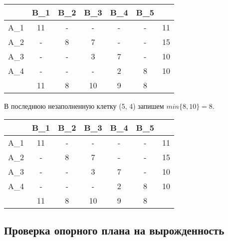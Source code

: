 \documentclass{article}
\begin{document}
\begin{table}[H]
    \centering
    \begin{tabular}{|c|c|c|c|c|c| |c|}
    \hline
        &\cellcolor{myGren} B_1 & \cellcolor{myGren}B_2 & \cellcolor{myGren}B_3 & \cellcolor{myGren}B_4 & \cellcolor{myGren} B_5 &  \\ \hline
       \cellcolor{myGren} A_1 &  11 & - &- & - & - & 11\\ \hline
       \cellcolor{myGren} A_2 & - & 8 & 7 & - & - & 15\\  \hline
       \cellcolor{myGren} A_3 & - & - & 3 & 7 & - & 10\\ \hline
       \cellcolor{myGren} A_4 & - & - & - & 2 & \cellcolor{Gray}8 & \cellcolor{Gray}10\\ \hline \hline
            & 11 &  8 & 10 & 9 & \cellcolor{Gray}8 & \\
        \hline
    \end{tabular}
    \label{tab:my_label}
\end{table}

\noindent В последнюю незаполненную клетку (5, 4) запишем $min\{8, 10\} = 8$.
\begin{table}[H]
    \centering
    \begin{tabular}{|c|c|c|c|c|c| |c|}
    \hline
        &\cellcolor{myGren} B_1 & \cellcolor{myGren}B_2 & \cellcolor{myGren}B_3 & \cellcolor{myGren}B_4 & \cellcolor{myGren} B_5 &  \\ \hline
       \cellcolor{myGren} A_1 &  11 & - &- & - & - & 11\\ \hline
       \cellcolor{myGren} A_2 & - & 8 & 7 & - & - & 15\\  \hline
       \cellcolor{myGren} A_3 & - & - & 3 & 7 & - & 10\\ \hline
       \cellcolor{myGren} A_4 & - & - & - & 2 & 8 & 10\\ \hline \hline
            & 11 &  8 & 10 & 9 & 8 & \\
        \hline
    \end{tabular}
    \label{tab:my_label}
\end{table}

\subsection{Проверка опорного плана на вырожденность}
\end{document}
